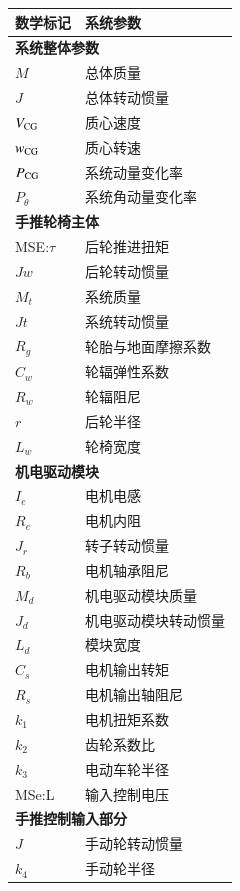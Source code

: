 \begin{table}[H]
\footnotesize
\caption{系统主要参数及其数学标记}\label{tab:param}
\begin{longtable}{l|l}
	\toprule
	\textbf{数学标记} & \textbf{系统参数}\\
	\midrule
	\endhead
	\multicolumn{2}{l}{\textbf{系统整体参数}} \\ %
	\midrule
	$ M $ & 总体质量\\
	$ J $ & 总体转动惯量\\
	$ V_{\rm{CG}} $ & 质心速度\\
	$ w_{\rm{CG}} $ & 质心转速\\
	$ P_{\rm{CG}} $ & 系统动量变化率\\
	$ P_{\theta} $ & 系统角动量变化率\\
	\midrule
	\multicolumn{2}{l}{\textbf{手推轮椅主体}} \\
	\midrule
	MSE:$\tau$ & 后轮推进扭矩 \\
	$ J w $ & 后轮转动惯量\\
	$ M_t $ & 系统质量\\
	$ J t $ & 系统转动惯量\\
	$ R_g $ & 轮胎与地面摩擦系数\\
	$ C_w $ & 轮辐弹性系数\\
	$ R_w $ & 轮辐阻尼\\
	$ r $ & 后轮半径\\
	$ L_w $ & 轮椅宽度\\
	\midrule
	\multicolumn{2}{l}{\textbf{机电驱动模块}} \\
	\midrule
	$ I_e $ & 电机电感\\
	$ R_e $ & 电机内阻\\
	$ J_r $ & 转子转动惯量\\
	$ R_b $ & 电机轴承阻尼\\
	$ M_d $ & 机电驱动模块质量\\
	$ J_d $ & 机电驱动模块转动惯量\\
	$ L_d $ & 模块宽度\\
	$ C_s $ & 电机输出转矩\\
	$ R_s $ & 电机输出轴阻尼\\
	$ k_1 $ & 电机扭矩系数\\ %
	$ k_2 $ & 齿轮系数比\\ %
	$ k_3 $ & 电动车轮半径 \\ %
	MSe:L & 输入控制电压\\
	\midrule
	\multicolumn{2}{l}{\textbf{手推控制输入部分}}\\
	\midrule
	$ J $ & 手动轮转动惯量\\
	$ k_4 $ & 手动轮半径\\ %
	\bottomrule
\end{longtable}
\end{table}